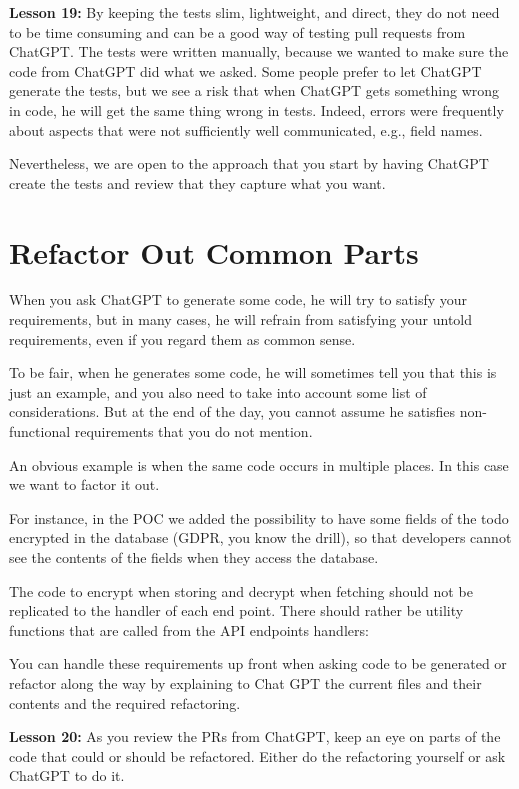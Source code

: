 \documentclass[runningheads]{llncs}
\begin{document}
\textbf{Lesson 19:} By keeping the tests slim, lightweight, and direct, they do not need to be time consuming and can be a good way of testing pull requests from ChatGPT.
The tests were written manually, because we wanted to make sure the code from ChatGPT did what we asked. Some people prefer to let ChatGPT generate the tests, but we see a risk that when ChatGPT gets something wrong in code, he will get the same thing wrong in tests. Indeed, errors were frequently about aspects that were not sufficiently well communicated, e.g., field names.

Nevertheless, we are open to the approach that you start by having ChatGPT create the tests and review that they capture what you want.

\section{Refactor Out Common Parts}
When you ask ChatGPT to generate some code, he will try to satisfy your requirements, but in many cases, he will refrain from satisfying your untold requirements, even if you regard them as common sense.

To be fair, when he generates some code, he will sometimes tell you that this is just an example, and you also need to take into account some list of considerations. But at the end of the day, you cannot assume he satisfies non-functional requirements that you do not mention.

An obvious example is when the same code occurs in multiple places. In this case we want to factor it out.

For instance, in the POC we added the possibility to have some fields of the todo encrypted in the database (GDPR, you know the drill), so that developers cannot see the contents of the fields when they access the database.

The code to encrypt when storing and decrypt when fetching should not be replicated to the handler of each end point. There should rather be utility functions that are called from the API endpoints handlers:
 
You can handle these requirements up front when asking code to be generated or refactor along the way by explaining to Chat GPT the current files and their contents and the required refactoring.

\textbf{Lesson 20:} As you review the PRs from ChatGPT, keep an eye on parts of the code that could or should be refactored. Either do the refactoring yourself or ask ChatGPT to do it.
\end{document}
